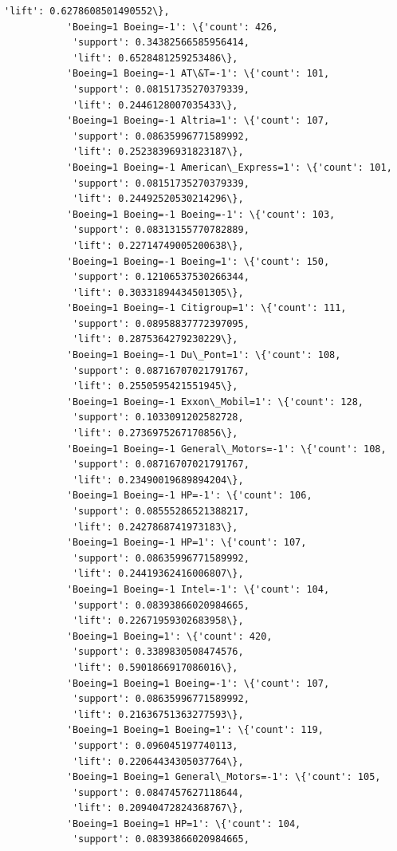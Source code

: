 \documentclass[11pt]{article}
\begin{document}
\begin{Verbatim}[commandchars=\\\{\}]
            'lift': 0.6278608501490552\},
           'Boeing=1 Boeing=-1': \{'count': 426,
            'support': 0.34382566585956414,
            'lift': 0.6528481259253486\},
           'Boeing=1 Boeing=-1 AT\&T=-1': \{'count': 101,
            'support': 0.08151735270379339,
            'lift': 0.2446128007035433\},
           'Boeing=1 Boeing=-1 Altria=1': \{'count': 107,
            'support': 0.08635996771589992,
            'lift': 0.25238396931823187\},
           'Boeing=1 Boeing=-1 American\_Express=1': \{'count': 101,
            'support': 0.08151735270379339,
            'lift': 0.24492520530214296\},
           'Boeing=1 Boeing=-1 Boeing=-1': \{'count': 103,
            'support': 0.08313155770782889,
            'lift': 0.22714749005200638\},
           'Boeing=1 Boeing=-1 Boeing=1': \{'count': 150,
            'support': 0.12106537530266344,
            'lift': 0.30331894434501305\},
           'Boeing=1 Boeing=-1 Citigroup=1': \{'count': 111,
            'support': 0.08958837772397095,
            'lift': 0.2875364279230229\},
           'Boeing=1 Boeing=-1 Du\_Pont=1': \{'count': 108,
            'support': 0.08716707021791767,
            'lift': 0.2550595421551945\},
           'Boeing=1 Boeing=-1 Exxon\_Mobil=1': \{'count': 128,
            'support': 0.1033091202582728,
            'lift': 0.2736975267170856\},
           'Boeing=1 Boeing=-1 General\_Motors=-1': \{'count': 108,
            'support': 0.08716707021791767,
            'lift': 0.23490019689894204\},
           'Boeing=1 Boeing=-1 HP=-1': \{'count': 106,
            'support': 0.08555286521388217,
            'lift': 0.2427868741973183\},
           'Boeing=1 Boeing=-1 HP=1': \{'count': 107,
            'support': 0.08635996771589992,
            'lift': 0.24419362416006807\},
           'Boeing=1 Boeing=-1 Intel=-1': \{'count': 104,
            'support': 0.08393866020984665,
            'lift': 0.22671959302683958\},
           'Boeing=1 Boeing=1': \{'count': 420,
            'support': 0.3389830508474576,
            'lift': 0.5901866917086016\},
           'Boeing=1 Boeing=1 Boeing=-1': \{'count': 107,
            'support': 0.08635996771589992,
            'lift': 0.21636751363277593\},
           'Boeing=1 Boeing=1 Boeing=1': \{'count': 119,
            'support': 0.096045197740113,
            'lift': 0.22064434305037764\},
           'Boeing=1 Boeing=1 General\_Motors=-1': \{'count': 105,
            'support': 0.0847457627118644,
            'lift': 0.20940472824368767\},
           'Boeing=1 Boeing=1 HP=1': \{'count': 104,
            'support': 0.08393866020984665,

\end{Verbatim}
\end{document}
